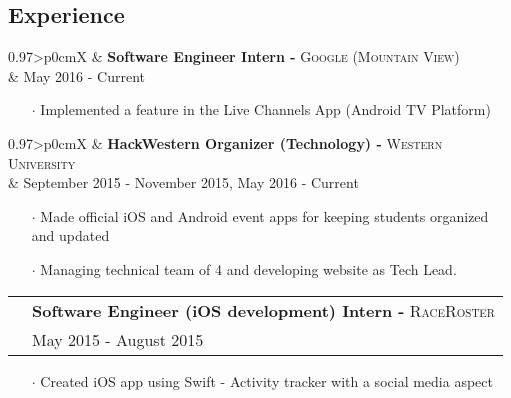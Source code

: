 \documentclass[letterpaper, oneside, final]{scrartcl} %
\newcommand{\gray}{\rowcolor[gray]{.90}} %
\begin{document}
\begin{center}
\vspace{-7mm}

\section{Experience}

\renewcommand{\arraystretch}{1.3}

\begin{tabularx}{0.97\linewidth}{>{\raggedleft\scshape}p{0cm}X}
\gray & \textbf{Software Engineer Intern -} \textsc{Google (Mountain View)}\\
\gray & {May 2016 - Current}\\
\end{tabularx}
\vspace{-0.1cm}
\begin{itemize} \itemsep-0.2cm
\item[$\cdot$] Implemented a feature in the Live Channels App (Android TV Platform)

\end{itemize}

\vspace{-0.05cm}

\begin{tabularx}{0.97\linewidth}{>{\raggedleft\scshape}p{0cm}X}
\gray & \textbf{HackWestern Organizer (Technology) -} \textsc{Western University}\\
\gray & {September 2015 - November 2015, May 2016 - Current}\\
\end{tabularx}
\vspace{-0.1cm}
\begin{itemize} \itemsep-0.2cm
\item[$\cdot$] Made official iOS and Android event apps for keeping students organized and updated
\item[$\cdot$]  Managing technical team of 4 and developing website as Tech Lead.
\end{itemize}

\vspace{-0.05cm}

\begin{tabularx}{0.97\linewidth}{>{\raggedleft\scshape}p{0cm}X}
\gray & \textbf{Software Engineer (iOS development) Intern -} \textsc{RaceRoster}\\
\gray & {May 2015 - August 2015}\\
\end{tabularx}
\vspace{-0.1cm}
\begin{itemize} \itemsep-0.2cm
\item[$\cdot$] Created iOS app using Swift - Activity tracker with a social media aspect \\
\end{itemize}


\end{center}
\end{document}
